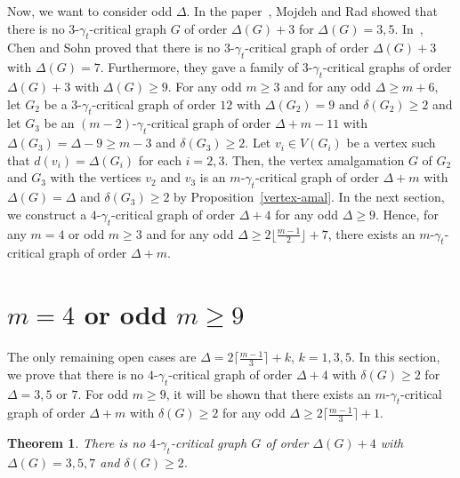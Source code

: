 \documentclass[12pt]{amsart}
\newtheorem{thm}{Theorem}
\begin{document}
Now, we want to consider odd $\Delta$. In the paper~\cite{MR}, Mojdeh and Rad showed that there is no
$3$-$\gamma_{t}$-critical graph $G$ of order $ \Delta(G)+3$ for
$\Delta(G)= 3, 5$. In~\cite{CS}, Chen and Sohn proved
that there is no $3$-$\gamma_{t}$-critical graph of order
$\Delta(G)+3$ with $\Delta(G)=7$. Furthermore, they gave a family
of $3$-$\gamma_{t}$-critical graphs of order $\Delta(G)+3$ with
$\Delta(G)\geq 9$.  For any odd $m \ge 3$ and for any odd $\Delta \ge m+6$, let $G_2$ be a
$3$-$\gamma_{t}$-critical graph of order
$12$ with $\Delta(G_2)=9$ and $\delta(G_2) \ge 2$ and let $G_3$ be an
$(m-2)$-$\gamma_{t}$-critical graph of order
$\Delta +m-11$ with $\Delta(G_3)=\Delta-9 \ge m-3$ and $\delta(G_3) \ge 2$. Let $v_i \in V(G_i)$ be a vertex such that
$d(v_i)=\Delta(G_i)$ for each $i=2,3$. Then, the vertex amalgamation $G$ of $G_2$ and  $G_3$ with the vertices $v_2$ and $v_3$ is an $m$-$\gamma_{t}$-critical graph of order
$\Delta +m$ with $\Delta(G)=\Delta$ and $\delta(G_3) \ge 2$ by Proposition~\ref{vertex-amal}.
In the next section, we construct a $4$-$\gamma_t$-critical graph of
order $\Delta +4$  for any odd $\Delta \ge 9$. Hence, for any
$m=4$ or odd $m \ge 3$ and for any odd $\Delta \ge 2\lfloor
\frac{m-1}{2}\rfloor +7$, there exists an $m$-$\gamma_t$-critical
graph of order $\Delta + m$.

\section{$m=4$ or odd $m \ge 9$} \label{m4}

The only remaining open cases are $\Delta =
2\lceil\frac{m-1}{3}\rceil +k$, $k=1, 3, 5$. In this section, we
prove that there is no $4$-$\gamma_{t}$-critical graph of order
$\Delta +4$ with $\delta(G)\geq 2$ for $\Delta = 3,5$ or $7$. For
odd $m \ge 9$, it will  be shown that there exists an
$m$-$\gamma_{t}$-critical graph of order $\Delta +m$ with
$\delta(G)\geq 2$ for any odd $\Delta \ge
2\lceil\frac{m-1}{3}\rceil +1$.

\begin{thm}\label{mainthm3} There is no $4$-$\gamma_{t}$-critical graph
$G$ of order $\Delta(G)+4$ with $\Delta(G)= 3, 5, 7$ and
$\delta(G) \geq 2$.
\end{thm}
\end{document}
